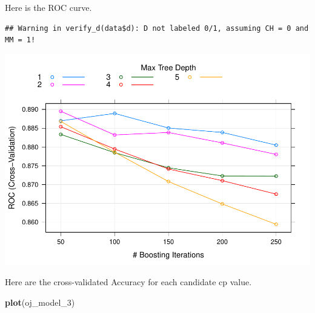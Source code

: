 \documentclass[
]{book}
\newenvironment{Shaded}{\begin{snugshade}}{\end{snugshade}}
\newcommand{\DataTypeTok}[1]{\textcolor[rgb]{0.13,0.29,0.53}{#1}}
\newcommand{\DecValTok}[1]{\textcolor[rgb]{0.00,0.00,0.81}{#1}}
\newcommand{\FloatTok}[1]{\textcolor[rgb]{0.00,0.00,0.81}{#1}}
\newcommand{\KeywordTok}[1]{\textcolor[rgb]{0.13,0.29,0.53}{\textbf{#1}}}
\newcommand{\NormalTok}[1]{#1}
\newcommand{\OperatorTok}[1]{\textcolor[rgb]{0.81,0.36,0.00}{\textbf{#1}}}
\newcommand{\StringTok}[1]{\textcolor[rgb]{0.31,0.60,0.02}{#1}}
\begin{document}
Here is the ROC curve.

\begin{Shaded}
\end{Shaded}

\begin{verbatim}
## Warning in verify_d(data$d): D not labeled 0/1, assuming CH = 0 and MM = 1!
\end{verbatim}

\includegraphics{data-sci_files/figure-latex/unnamed-chunk-86-1.pdf}

Here are the cross-validated Accuracy for each candidate cp value.

\begin{Shaded}
\begin{Highlighting}[]
\KeywordTok{plot}\NormalTok{(oj_model_}\DecValTok{3}\NormalTok{)}
\end{Highlighting}
\end{Shaded}
\end{document}
